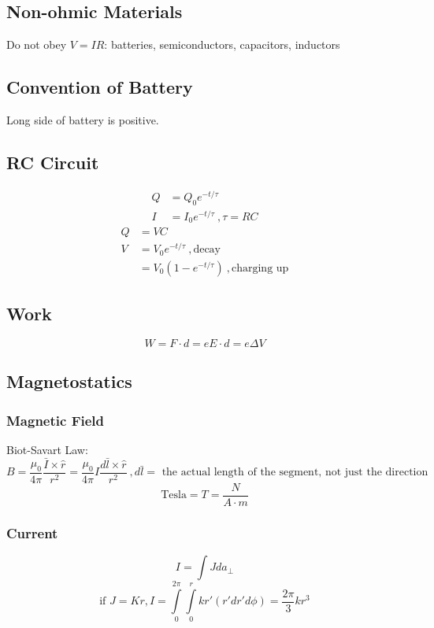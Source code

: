 \documentclass[10pt,a4paper]{article}
\begin{document}
\subsection{Non-ohmic Materials}
Do not obey $V=IR$: batteries, semiconductors, capacitors, inductors

\subsection{Convention of Battery}
Long side of battery is positive.

\subsection{RC Circuit}
\begin{align}
 Q &= Q_0 e^{-t/\tau}\\
 I &= I_0 e^{-t/\tau}~,\tau = RC
\end{align}
\begin{align}
 Q &= VC\\
V &= V_0 e^{-t/\tau}~,\textrm{decay}\\
&= V_0(1-e^{-t/\tau})~, \textrm{charging up}
\end{align}

\subsection{Work}
\begin{equation}
 W = F\cdot d = eE\cdot d = e \Delta V
\end{equation}

\subsection{Magnetostatics}

\subsubsection{Magnetic Field}
Biot-Savart Law:
\begin{equation}
 B = \frac{\mu_0}{4\pi}\frac{\bar{I} \times \hat{r}}{r^2} = \frac{\mu_0}{4 \pi}I \frac{d\bar{l} \times \hat{r}}{r^2}~,d\bar{l} =\textrm{ the actual length of the segment, not just the direction}
\end{equation}
\begin{equation}
 \textrm{Tesla} = T = \frac{N}{A \cdot m}
\end{equation}

\subsubsection{Current}
\begin{equation}
 I = \int J da_\perp 
\end{equation}
\begin{equation}
\textrm{if }J = Kr, I = \int \limits_0^{2\pi} \int \limits_0^r kr' (r' dr' d\phi) = \frac{2\pi}{3}kr^3
\end{equation}
\end{document}

